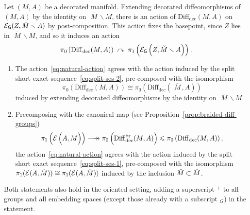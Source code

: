 \documentclass[AHL,Unicode,published]{cedram}
\newcommand{\Int}{\mathring}
\newcommand{\rdec}{\mathrm{dec}}
\newcommand{\mbar}{\ensuremath{{\,\,\overline{\!\! M\!}\,}}}
\newcommand{\sG}{\mathsf{G}}
\newcommand{\cE}{\mathcal{E}}
\newcommand{\longtwoheadrightarrow}{\longrightarrow\mathrel{\mkern-14mu}\rightarrow}
\newcommand{\diffdec}{\ensuremath{\mathrm{Diff}_{\rdec}}}
\newcommand{\diffdecbr}{\ensuremath{\mathrm{Diff}_{\rdec}^{\mathrm{br}}}}
\renewcommand{\leq}{\leqslant}
\newcommand*{\romanenumi}{\renewcommand*{\theenumi}{\roman{enumi}}}
\begin{document}
\begin{prop}\label{prop:two-actions}
Let $(M,A)$ be a decorated manifold. Extending decorated diffeomorphisms of $(M,A)$ by the identity on $\mbar \smallsetminus M$, there is an action of $\diffdec(M,A)$ on $\cE_{\sG}(Z,\Breve{M} \smallsetminus A)$ by post-composition. This action fixes the basepoint, since $Z$ lies in $\mbar \smallsetminus M$, and so it induces an action
\begin{equation}\label{eq:natural-action}
\pi_{0}\left(\diffdec(M,A)\right) \;\curvearrowright\; \pi_{1}\left(\cE_{\sG}\left(Z,\Breve{M} \smallsetminus A\right)\right).
\end{equation}
\begin{enumerate}\romanenumi
\item\label{prop1.48.1} The action~\eqref{eq:natural-action} agrees with the action induced by the split short exact sequence~\eqref{eq:split-ses-2}, pre-composed with the isomorphism
\[
\pi_{0}\left(\diffdec(M,A)\right) \cong \pi_{0}\left(\diffdec(\mbar,A)\right)
\]
induced by extending decorated diffeomorphisms by the identity on $\mbar \smallsetminus M$.

\item\label{prop1.48.2} Precomposing with the canonical map (see Proposition~\ref{prop:braided-diff-groups})
\begin{equation}\label{eq:from-motion-to-mcg}
\pi_{1}\left(\cE\left(A,\Int{M}\right)\right) \longtwoheadrightarrow \pi_{0}\left(\diffdecbr(M,A)\right) \leq \pi_{0}\left(\diffdec(M,A)\right),
\end{equation}
the action~\eqref{eq:natural-action} agrees with the action induced by the split short exact sequence~\eqref{eq:split-ses-1}, pre-composed with the isomorphism $\pi_{1}(\cE(A,\Int{M})) \cong \pi_{1}(\cE(A,\Breve{M}))$ induced by the inclusion $\Int{M} \subset \Breve{M}$.
\end{enumerate}
Both statements also hold in the oriented setting, adding a superscript ${}^{+}$ to all groups and all embedding spaces (except those already with a subscript ${}_G$) in the statement.
\end{prop}
\end{document}
